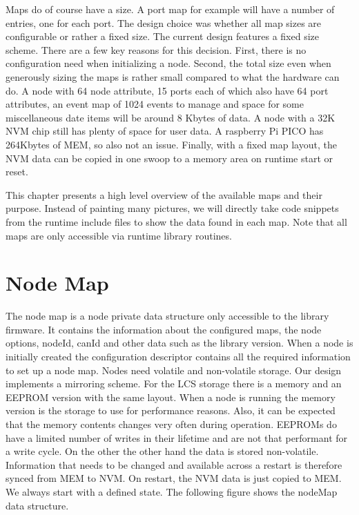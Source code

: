 Maps do of course have a size. A port map for example will have a number of entries, one for each port. The design choice was whether all map sizes are configurable or rather a fixed size. The current design features a fixed size scheme. There are a few key reasons for this decision. First, there is no configuration need when initializing a node. Second, the total size even when generously sizing the maps is rather small compared to what the hardware can do. A node with 64 node attribute, 15 ports each of which also have 64 port attributes, an event map of 1024 events to manage and space for some miscellaneous date items will be around 8 Kbytes of data. A node with a 32K NVM chip still has plenty of space for user data. A raspberry Pi PICO has 264Kbytes of MEM, so also not an issue. Finally, with a fixed map layout, the NVM data can be copied in one swoop to a memory area on runtime start or reset. 

This chapter presents a high level overview of the available maps and their purpose. Instead of painting many pictures, we will directly take code snippets from the runtime include files to show the data found in each map. Note that all maps are only accessible via runtime library routines.

\section{Node Map}

The node map is a node private data structure only accessible to the library firmware. It contains the information about the configured maps, the node options, nodeId, canId and other data such as the library version. When a node is initially created the configuration descriptor contains all the required information to set up a node map. Nodes need volatile and non-volatile storage. Our design implements a mirroring scheme. For the LCS storage there is a memory and an EEPROM version with the same layout. When a node is running the memory version is the storage to use for performance reasons. Also, it can be expected that the memory contents changes very often during operation. EEPROMs do have a limited number of writes in their lifetime and are not that performant for a write cycle. On the other the other hand the data is stored non-volatile. Information that needs to be changed and available across a restart is therefore synced from MEM to NVM. On restart, the NVM data is just copied to MEM. We always start with a defined state. The following figure shows the nodeMap data structure.


